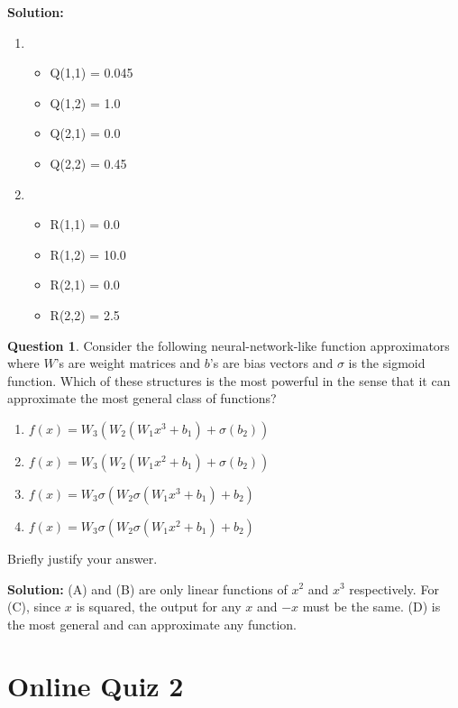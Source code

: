\documentclass{article}
\theoremstyle{definition}
\newtheorem{question}{Question}
\begin{document}
\noindent\textbf{Solution:}
\begin{enumerate}
    \item
    \begin{itemize}
        \item Q(1,1) = 0.045
        \item Q(1,2) = 1.0
        \item Q(2,1) = 0.0
        \item Q(2,2) = 0.45
    \end{itemize}
    \item
    \begin{itemize}
        \item R(1,1) = 0.0
        \item R(1,2) = 10.0
        \item R(2,1) = 0.0
        \item R(2,2) = 2.5
    \end{itemize}
\end{enumerate}

\begin{question}
Consider the following neural-network-like function approximators where $W$'s are weight matrices and $b$'s are bias vectors and $\sigma$ is the sigmoid function. 
Which of these structures is the most powerful in the sense that it can approximate the most general class of functions?

\begin{enumerate}[label=(\Alph*)]
\item $f(x) = W_3(W_2(W_1 x^3 + b_1) + \sigma(b_2))$
\item $f(x) = W_3(W_2(W_1 x^2 + b_1) + \sigma(b_2))$
\item $f(x) = W_3 \sigma(W_2 \sigma(W_1 x^3 + b_1) + b_2)$
\item $f(x) = W_3 \sigma(W_2 \sigma(W_1 x^2 + b_1) + b_2)$
\end{enumerate}

Briefly justify your answer.
\end{question}

\noindent\textbf{Solution:}
(A) and (B) are only linear functions of $x^2$ and $x^3$ respectively. For (C), since $x$ is squared, the output for any $x$ and $-x$ must be the same. (D) is the most general and can approximate any function.

\section*{Online Quiz 2}
\end{document}
